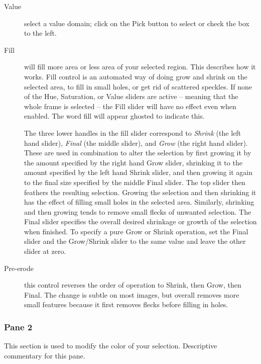\begin{description}
    \item[Value] select a value domain; click on the Pick button to select or check the box to the left.
    \item[Fill] will fill more area or less area of your selected region. This describes how it works. Fill control is an automated way of doing grow and shrink on the selected area, to fill in small holes, or get rid of scattered speckles. If none of the Hue, Saturation, or Value sliders are active -- meaning that the whole frame is selected -- the Fill slider will have no effect even when enabled. The word fill will appear ghosted to indicate this.
    
    The three lower handles in the fill slider correspond to \textit{Shrink} (the left hand slider), \textit{Final} (the middle slider), and \textit{Grow} (the right hand slider). These are used in combination to alter the selection by first growing it by the amount specified by the right hand Grow slider, shrinking it to the amount specified by the left hand Shrink slider, and then growing it again to the final size specified by the middle Final slider. The top slider then feathers the resulting selection.
    Growing the selection and then shrinking it has the effect of filling small holes in the selected area. Similarly, shrinking and then growing tends to remove small flecks of unwanted selection. The Final slider specifies the overall desired shrinkage or growth of the selection when finished. To specify a pure Grow or Shrink operation, set the Final slider and the Grow/Shrink slider to the same value and leave the other slider at zero.
    \item[Pre-erode] this control reverses the order of operation to Shrink, then Grow, then Final. The change is subtle on most images, but overall removes more small features because it first removes flecks before filling in holes.
\end{description}

\subsubsection*{Pane 2}
\label{ssub:pane2}

This section is used to modify the color of your selection. Descriptive commentary for this pane.

